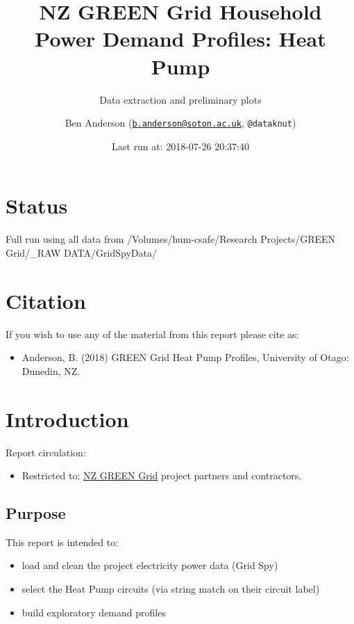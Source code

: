 \documentclass[]{article}
\title{NZ GREEN Grid Household Power Demand Profiles: Heat Pump}
\subtitle{Data extraction and preliminary plots}
\author{Ben Anderson
(\href{mailto:b.anderson@soton.ac.uk}{\nolinkurl{b.anderson@soton.ac.uk}},
\texttt{@dataknut})}
\date{Last run at: 2018-07-26 20:37:40}
\providecommand{\tightlist}{%
  \setlength{\itemsep}{0pt}\setlength{\parskip}{0pt}}
\begin{document}
\maketitle

{
\setcounter{tocdepth}{2}
\tableofcontents
}
\newpage

\section{Status}\label{status}

Full run using all data from /Volumes/hum-csafe/Research Projects/GREEN
Grid/\_RAW DATA/GridSpyData/

\section{Citation}\label{citation}

If you wish to use any of the material from this report please cite as:

\begin{itemize}
\tightlist
\item
  Anderson, B. (2018) GREEN Grid Heat Pump Profiles, University of
  Otago: Dunedin, NZ.
\end{itemize}

\newpage

\section{Introduction}\label{introduction}

Report circulation:

\begin{itemize}
\tightlist
\item
  Restricted to:
  \href{https://www.otago.ac.nz/centre-sustainability/research/energy/otago050285.html}{NZ
  GREEN Grid} project partners and contractors.
\end{itemize}

\subsection{Purpose}\label{purpose}

This report is intended to:

\begin{itemize}
\tightlist
\item
  load and clean the project electricity power data (Grid Spy)
\item
  select the Heat Pump circuits (via string match on their circuit
  label)
\item
  build exploratory demand profiles
\end{itemize}
\end{document}
